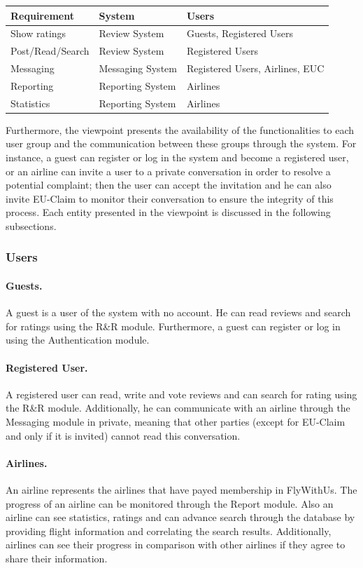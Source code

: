 \begin{longtable}{| l | l | l |}
\hline
\label{tab:associateSysReq} 
\textbf{Requirement} & \textbf{System} & \textbf{Users} \\ \hline
Show ratings & Review System & Guests, Registered Users \\ \hline
Post/Read/Search & Review System & Registered Users \\ \hline
Messaging & Messaging System & Registered Users, Airlines, EUC \\ \hline
Reporting  & Reporting System & Airlines \\ \hline
Statistics & Reporting System & Airlines \\ \hline 

\end{longtable}

Furthermore, the viewpoint presents the availability of the functionalities to each user group and the communication between these groups through the system. For instance, a guest can register or log in the system and  become a registered user, or an airline can invite a user to a private conversation in order to resolve a potential complaint; then the user can accept the invitation and he can  also invite EU-Claim to monitor their conversation to ensure the integrity of this process. Each entity presented in the viewpoint is discussed in the following subsections.

\subsubsection{Users}
\paragraph{Guests.} A guest is a user of the system with no account. He can read reviews and search for ratings using the R\&R module. Furthermore, a guest can  register or log in using the Authentication module.

\paragraph{Registered User.} A registered user can read, write and vote reviews and can search for rating using the R\&R module. Additionally, he can communicate with an airline through the Messaging module in private, meaning that other parties  (except for EU-Claim and only if it is invited) cannot read this conversation.

\paragraph{Airlines.} An airline represents the airlines that have payed membership in FlyWithUs. The progress of an airline can be monitored through the Report module. Also an airline can see statistics, ratings and can advance search through the database by providing flight information and correlating the search results. Additionally, airlines can see their progress in comparison with other airlines if they agree to share their information.

